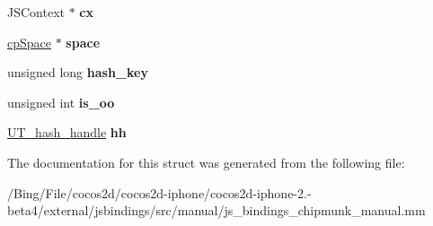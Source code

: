 \begin{DoxyCompactItemize}
\item 
\hypertarget{structcollision__handler_a553b5fff5ec7119ca8e1ad67b3e1398c}{J\-S\-Context $\ast$ {\bfseries cx}}\label{structcollision__handler_a553b5fff5ec7119ca8e1ad67b3e1398c}

\item 
\hypertarget{structcollision__handler_aa4f810d20cf12f2d645ec56878a56ab7}{\hyperlink{structcp_space}{cp\-Space} $\ast$ {\bfseries space}}\label{structcollision__handler_aa4f810d20cf12f2d645ec56878a56ab7}

\item 
\hypertarget{structcollision__handler_a913c3d7277a0b0daa0a521d6c74d4075}{unsigned long {\bfseries hash\-\_\-key}}\label{structcollision__handler_a913c3d7277a0b0daa0a521d6c74d4075}

\item 
\hypertarget{structcollision__handler_ada9f794d37d200d1e684646e7b7e9c65}{unsigned int {\bfseries is\-\_\-oo}}\label{structcollision__handler_ada9f794d37d200d1e684646e7b7e9c65}

\item 
\hypertarget{structcollision__handler_aec484622c8a42c73ea160a3dd4f35b8f}{\hyperlink{struct_u_t__hash__handle}{U\-T\-\_\-hash\-\_\-handle} {\bfseries hh}}\label{structcollision__handler_aec484622c8a42c73ea160a3dd4f35b8f}

\end{DoxyCompactItemize}


The documentation for this struct was generated from the following file\-:\begin{DoxyCompactItemize}
\item 
/\-Bing/\-File/cocos2d/cocos2d-\/iphone/cocos2d-\/iphone-\/2.-\/beta4/external/jsbindings/src/manual/js\-\_\-bindings\-\_\-chipmunk\-\_\-manual.\-mm\end{DoxyCompactItemize}
